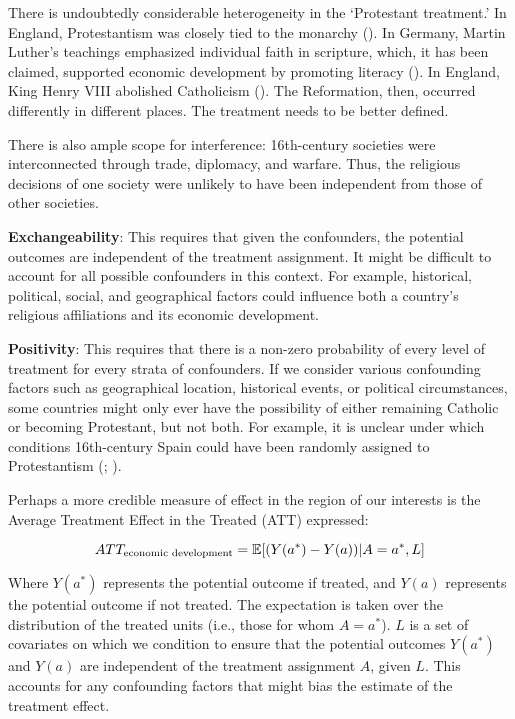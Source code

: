 \documentclass[
  single column]{article}
\begin{document}
There is undoubtedly considerable heterogeneity in the `Protestant
treatment.' In England, Protestantism was closely tied to the monarchy
(). In Germany, Martin
Luther's teachings emphasized individual faith in scripture, which, it
has been claimed, supported economic development by promoting literacy
(). In England,
King Henry VIII abolished Catholicism
(). The Reformation, then,
occurred differently in different places. The treatment needs to be
better defined.

There is also ample scope for interference: 16th-century societies were
interconnected through trade, diplomacy, and warfare. Thus, the
religious decisions of one society were unlikely to have been
independent from those of other societies.

\textbf{Exchangeability}: This requires that given the confounders, the
potential outcomes are independent of the treatment assignment. It might
be difficult to account for all possible confounders in this context.
For example, historical, political, social, and geographical factors
could influence both a country's religious affiliations and its economic
development.

\textbf{Positivity}: This requires that there is a non-zero probability
of every level of treatment for every strata of confounders. If we
consider various confounding factors such as geographical location,
historical events, or political circumstances, some countries might only
ever have the possibility of either remaining Catholic or becoming
Protestant, but not both. For example, it is unclear under which
conditions 16th-century Spain could have been randomly assigned to
Protestantism (;
).

Perhaps a more credible measure of effect in the region of our interests
is the Average Treatment Effect in the Treated (ATT) expressed:

\[
ATT_{\textnormal{economic~development}} = \mathbb{E}[(Y(a^*) - Y(a))|A = a^*,L]
\]

Where \(Y(a^*)\) represents the potential outcome if treated, and
\(Y(a)\) represents the potential outcome if not treated. The
expectation is taken over the distribution of the treated units (i.e.,
those for whom \(A = a^*\)). \(L\) is a set of covariates on which we
condition to ensure that the potential outcomes \(Y(a^*)\) and \(Y(a)\)
are independent of the treatment assignment \(A\), given \(L\). This
accounts for any confounding factors that might bias the estimate of the
treatment effect.
\end{document}
